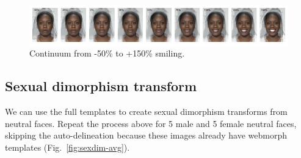 \documentclass[
  doc,floatsintext]{apa6}
\begin{document}
\begin{figure}
\includegraphics[width=1\linewidth]{index_files/figure-latex/continuum-1} \caption{Continuum from -50\% to +150\% smiling.}\label{fig:continuum}
\end{figure}

\hypertarget{sexual-dimorphism-transform}{%
\subsection{Sexual dimorphism transform}\label{sexual-dimorphism-transform}}

We can use the full templates to create sexual dimorphism transforms from neutral faces. Repeat the process above for 5 male and 5 female neutral faces, skipping the auto-delineation because these images already have webmorph templates (Fig.~\ref{fig:sexdim-avg}).
\end{document}

